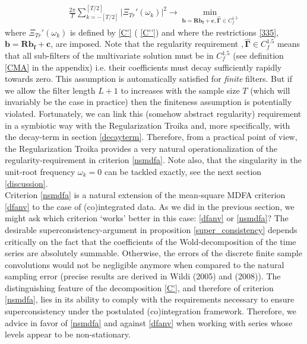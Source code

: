 \documentclass[11pt]{article}
\begin{document}
\begin{eqnarray}\label{nsmdfa}
\frac{2\pi}{T}\sum_{k=-[T/2]}^{[T/2]}\left|\Xi_{Tr}'(\omega_k)\right|^2\to \min_{\mathbf{b=Rb_f+c,\hat{\Gamma}}\in C_f^{1.5}}
\end{eqnarray}
where $\Xi_{Tr}'(\omega_k)$ is defined by \ref{C'} ( \ref{C''}) and where the restrictions \ref{335}, $\mathbf{b=Rb_f+c}$, are imposed. Note that the regularity requirement $,\mathbf{\hat{\Gamma}}\in C_f^{1.5}$ means that all sub-filters of the multivariate solution must be in $C_f^{1.5}$ (see definition \ref{CMA} in the appendix) i.e. their coefficients must decay sufficiently rapidly towards zero. This assumption is automatically satisfied for \emph{finite} filters. But if we allow the filter length $L+1$ to increases with the sample size $T$ (which will invariably be the case in practice) then the finiteness assumption is potentially violated. Fortunately,  we can link this (somehow abstract regularity) requirement  in a symbiotic way with the Regularization Troika and, more specifically, with the decay-term in section \ref{decayterm}. Therefore, from a practical point of view, the Regularization Troika provides a very natural operationalization of the regularity-requirement in criterion \ref{nsmdfa}. Note also, that the singularity in the unit-root frequency $\omega_k=0$ can be tackled exactly, see the next section \ref{discussion}. \\

Criterion \ref{nsmdfa} is  a natural extension of the mean-square MDFA criterion \ref{dfanv} to the case of (co)integrated data. As we did in the previous section, we might ask which criterion `works' better in this case: \ref{dfanv} or \ref{nsmdfa}? The desirable superconsistency-argument in proposition \ref{super_consistency} depends critically on the fact that the coefficients of the Wold-decomposition of the time series are absolutely summable. Otherwise, the errors of the discrete finite sample convolutions would not be negligible anymore when compared to the natural sampling error (precise results are derived in Wildi (2005) and (2008)). The distinguishing feature of the decomposition \ref{C'}, and therefore of criterion \ref{nsmdfa}, lies in its ability to comply with the requirements necessary to ensure superconsistency  under the postulated (co)integration framework. Therefore, we advice in favor of \ref{nsmdfa} and against \ref{dfanv} when working with series whose levels appear to be non-stationary.
\end{document}
